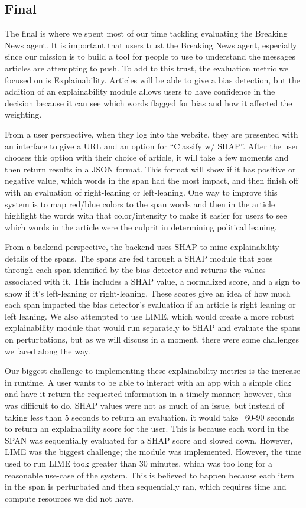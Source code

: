 \documentclass{article}
\begin{document}
\subsection{Final}

The final is where we spent most of our time tackling evaluating the Breaking News agent. It is important that users trust the Breaking News agent, especially since our mission is to build a tool for people to use to understand the messages articles are attempting to push. To add to this trust, the evaluation metric we focused on is Explainability. Articles will be able to give a bias detection, but the addition of an explainability module allows users to have confidence in the decision because it can see which words flagged for bias and how it affected the weighting.

From a user perspective, when they log into the website, they are presented with an interface to give a URL and an option for “Classify w/ SHAP”. After the user chooses this option with their choice of article, it will take a few moments and then return results in a JSON format. This format will show if it has positive or negative value, which words in the span had the most impact, and then finish off with an evaluation of right-leaning or left-leaning. One way to improve this system is to map red/blue colors to the span words and then in the article highlight the words with that color/intensity to make it easier for users to see which words in the article were the culprit in determining political leaning.

From a backend perspective, the backend uses SHAP to mine explainability details of the spans. The spans are fed through a SHAP module that goes through each span identified by the bias detector and returns the values associated with it. This includes a SHAP value, a normalized score, and a sign to show if it’s left-leaning or right-leaning. These scores give an idea of how much each span impacted the bias detector’s evaluation if an article is right leaning or left leaning. We also attempted to use LIME, which would create a more robust explainability module that would run separately to SHAP and evaluate the spans on perturbations, but as we will discuss in a moment, there were some challenges we faced along the way.

Our biggest challenge to implementing these explainability metrics is the increase in runtime. A user wants to be able to interact with an app with a simple click and have it return the requested information in a timely manner; however, this was difficult to do. SHAP values were not as much of an issue, but instead of taking less than 5 seconds to return an evaluation, it would take ~60-90 seconds to return an explainability score for the user. This is because each word in the SPAN was sequentially evaluated for a SHAP score and slowed down. However, LIME was the biggest challenge; the module was implemented. However, the time used to run LIME took greater than 30 minutes, which was too long for a reasonable use-case of the system. This is believed to happen because each item in the span is perturbated and then sequentially ran, which requires time and compute resources we did not have.
\end{document}
